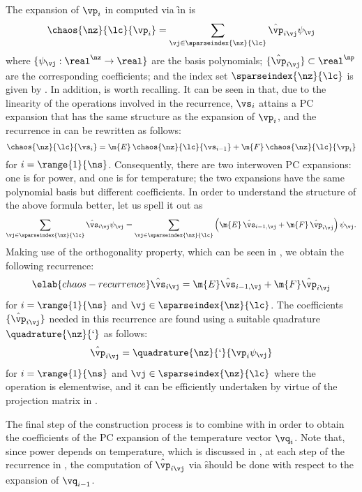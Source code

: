 The expansion of $\vp_i$ in  computed via \f in
 is
\[
  \chaos{\nz}{\lc}{\vp_i} = \sum_{\vj \in \sparseindex{\nz}{\lc}} \hat{\vp}_{i \vj} \psi_{\vj}
\]
where $\{ \psi_{\vj}: \real^\nz \to \real \}$ are the basis polynomials; $\{
\hat{\vp}_{i \vj} \} \subset \real^\np$ are the corresponding coefficients; and
the index set $\sparseindex{\nz}{\lc}$ is given by
. In addition,
 is worth recalling. It can be seen in
 that, due to the linearity of the operations
involved in the recurrence, $\vs_i$ attains a \ac{PC} expansion that has the
same structure as the expansion of $\vp_i$, and the recurrence in
 can be rewritten as follows:
\[
  \chaos{\nz}{\lc}{\vs_i} = \m{E} \, \chaos{\nz}{\lc}{\vs_{i - 1}} + \m{F} \, \chaos{\nz}{\lc}{\vp_i}
\]
for $i = \range{1}{\ns}$. Consequently, there are two interwoven \ac{PC}
expansions: one is for power, and one is for temperature; the two expansions
have the same polynomial basis but different coefficients. In order to
understand the structure of the above formula better, let us spell it out as
\[
  \sum_{\vj \in \sparseindex{\nz}{\lc}} \hat{\vs}_{i \vj} \psi_{\vj} =
  \sum_{\vj \in \sparseindex{\nz}{\lc}} \left(\m{E} \, \hat{\vs}_{i - 1, \vj} + \m{F} \, \hat{\vp}_{i \vj}\right) \psi_{\vj}.
\]
Making use of the orthogonality property, which can be seen in
, we obtain the following recurrence:
\begin{equation} \elab{chaos-recurrence}
  \hat{\vs}_{i \vj} = \m{E} \hat{\vs}_{i - 1, \vj} + \m{F} \hat{\vp}_{i \vj}
\end{equation}
for $i = \range{1}{\ns}$ and $\vj \in \sparseindex{\nz}{\lc}$. The coefficients
$\{ \hat{\vp}_{i \vj} \}$ needed in this recurrence are found using a suitable
quadrature $\quadrature{\nz}{\lq}$ as follows:
\[
  \hat{\vp}_{i \vj} = \quadrature{\nz}{\lq}{\vp_i \psi_{\vj}}
\]
for $i = \range{1}{\ns}$ and $\vj \in \sparseindex{\nz}{\lc}$ where the
operation is elementwise, and it can be efficiently undertaken by virtue of the
projection matrix in .

The final step of the construction process is to combine 
with  in order to obtain the coefficients of the
\ac{PC} expansion of the temperature vector $\vq_i$. Note that, since power
depends on temperature, which is discussed in , at each step
of the recurrence in , the computation of $\hat{\vp}_{i
\vj}$ via \f should be done with respect to the expansion of $\vq_{i - 1}$.

